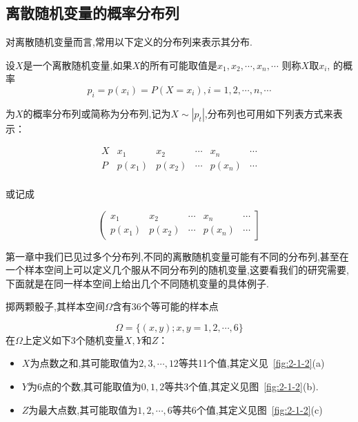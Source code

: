 \subsection{离散随机变量的概率分布列}

对离散随机变量而言,常用以下定义的分布列来表示其分布.

\begin{definition}{}{}
	设$ X $是一个离散随机变量,如果$ X $的所有可能取值是$ x_1,x_{2}, \cdots, x_{n}, \cdots$ 则称$ X $取$ x_i $, 的概率
	\begin{equation}
	p_{i}=p\left(x_{i}\right)=P\left(X=x_{i}\right), i=1,2, \cdots, n, \cdots \label{eq:2.1.2}
	\end{equation}
	
	为$ X $的概率分布列或简称为分布列,记为$X \sim\left|p_{t}\right|$,分布列也可用如下列表方式来表示：
	
	\[
	\begin{array}{c|ccccc}
	X	&    x_{1}     &    x_{2}     &    \cdots     &     x_{n}    &   \cdots \\ \hline
	P	&    p(x_1)     &    p(x_2)     &    \cdots     &    p(x_n)     &   \cdots \\
	\end{array}
	\]
	
	
	或记成
	
	\[
	\left( \begin{array}{ccccc}{x_{1}} & {x_{2}} & {\cdots} & {x_{n}} & {\cdots} \\ {p\left(x_{1}\right)} & {p\left(x_{2}\right)} & {\cdots} & {p\left(x_{n}\right)} & {\cdots}\end{array}\right]
	\]
	
\end{definition}


第一章中我们已见过多个分布列,不同的离散随机变量可能有不同的分布列,甚至在一个样本空间上可以定义几个服从不同分布列的随机变量,这要看我们的研究需要,下面就是在同一样本空间上给出几个不同随机变量的具体例子.
\begin{example}
	掷两颗骰子,其样本空间$\Omega$含有36个等可能的样本点
	
	\[
	\Omega=\{(x, y) ; x, y=1,2, \cdots, 6\}
	\]
	在$ \Omega $上定义如下3个随机变量$ X,Y $和$ Z $：
	\begin{itemize}
		\item $ X $为点数之和,其可能取值为$2,3, \cdots, 12$等共11个值,其定义见~\ref{fig:2-1-2}(a)
		\item $ Y $为6点的个数,其可能取值为$ 0,1,2 $等共$ 3 $个值,其定义见图~\ref{fig:2-1-2}(b).
		\item $ Z $为最大点数,其可能取值为$1,2, \cdots, 6$等共$ 6 $个值,其定义见图~\ref{fig:2-1-2}(c)
	\end{itemize}
\end{example}


